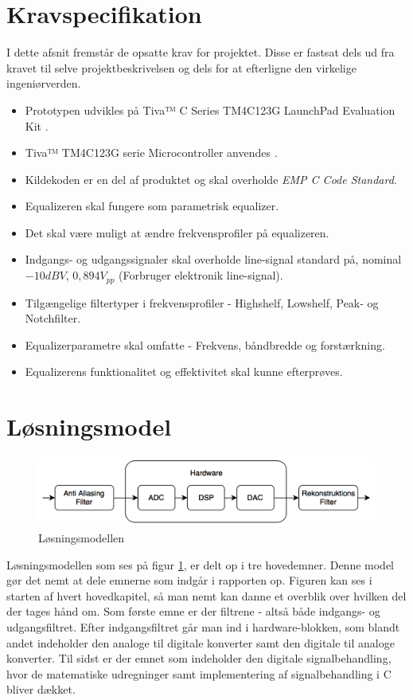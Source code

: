 \section{Kravspecifikation} \label{afs:kravspecifikation}
I dette afsnit fremstår de opsatte krav for projektet.
Disse er fastsat dels ud fra kravet til selve projektbeskrivelsen og dels for at efterligne den virkelige ingeniørverden.

\begin{itemize}[noitemsep]
	\item Prototypen udvikles på Tiva™ C Series TM4C123G LaunchPad Evaluation Kit \cite{spmt281a}.
	\item Tiva™ TM4C123G serie Microcontroller anvendes \cite{spmu296}.
	\item Kildekoden er en del af produktet og skal overholde \textit{EMP C Code Standard}\cite{emp-c}.
	\item Equalizeren skal fungere som parametrisk equalizer.
	\item Det skal være muligt at ændre frekvensprofiler på equalizeren.
	\item Indgangs- og udgangssignaler skal overholde line-signal standard på, nominal $-10 dBV$, $0,894 V_{pp}$ (Forbruger elektronik line-signal).
	\item Tilgængelige filtertyper i frekvensprofiler - Highshelf, Lowshelf, Peak- og Notchfilter.
	\item Equalizerparametre skal omfatte - Frekvens, båndbredde og forstærkning.
	\item Equalizerens funktionalitet og effektivitet skal kunne efterprøves.
\end{itemize}


\section{Løsningsmodel}

\begin{figure}[h]
	\centering
	\includegraphics[width=0.8\linewidth]{billeder/flow_losn}
	\caption{Løsningsmodellen}
	\label{fig:losningsmodel}
\end{figure}

Løsningsmodellen som ses på figur \ref{fig:losningsmodel}, er delt op i tre hovedemner. Denne model gør det nemt at dele emnerne som indgår i rapporten op. Figuren kan ses i starten af hvert hovedkapitel, så man nemt kan danne et overblik over hvilken del der tages hånd om. Som første emne er der filtrene - altså både indgangs- og udgangsfiltret. Efter indgangsfiltret går man ind i hardware-blokken, som blandt andet indeholder den analoge til digitale konverter samt den digitale til analoge konverter. Til sidst er der emnet som indeholder den digitale signalbehandling, hvor de matematiske udregninger samt implementering af signalbehandling i C bliver dækket. 


